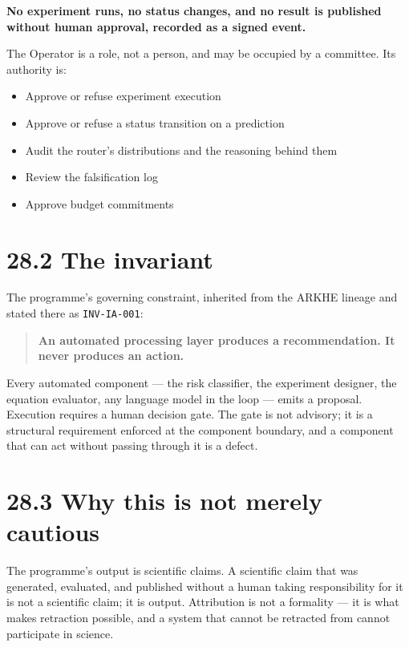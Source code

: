 \documentclass[
  11pt]{report}
\providecommand{\tightlist}{%
  \setlength{\itemsep}{0pt}\setlength{\parskip}{0pt}}
\begin{document}
\textbf{No experiment runs, no status changes, and no result is
published without human approval, recorded as a signed event.}

The Operator is a role, not a person, and may be occupied by a
committee. Its authority is:

\begin{itemize}
\tightlist
\item
  Approve or refuse experiment execution
\item
  Approve or refuse a status transition on a prediction
\item
  Audit the router's distributions and the reasoning behind them
\item
  Review the falsification log
\item
  Approve budget commitments
\end{itemize}

\hypertarget{the-invariant}{%
\section{28.2 The invariant}\label{the-invariant}}

The programme's governing constraint, inherited from the ARKHE lineage
and stated there as \texttt{INV-IA-001}:

\begin{quote}
\textbf{An automated processing layer produces a recommendation. It
never produces an action.}
\end{quote}

Every automated component --- the risk classifier, the experiment
designer, the equation evaluator, any language model in the loop ---
emits a proposal. Execution requires a human decision gate. The gate is
not advisory; it is a structural requirement enforced at the component
boundary, and a component that can act without passing through it is a
defect.

\hypertarget{why-this-is-not-merely-cautious}{%
\section{28.3 Why this is not merely
cautious}\label{why-this-is-not-merely-cautious}}

The programme's output is scientific claims. A scientific claim that was
generated, evaluated, and published without a human taking
responsibility for it is not a scientific claim; it is output.
Attribution is not a formality --- it is what makes retraction possible,
and a system that cannot be retracted from cannot participate in
science.
\end{document}

